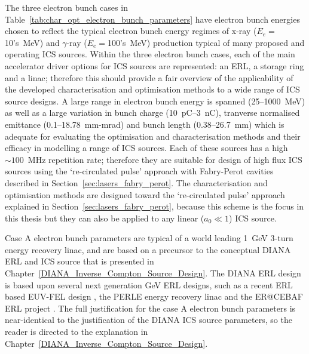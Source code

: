 \documentclass[../main.tex]{subfiles}
\begin{document}
The three electron bunch cases in Table~\ref{tab:char_opt_electron_bunch_parameters} have electron bunch energies chosen to reflect the typical electron bunch energy regimes of x-ray ($E_{e} =$10's~\si{\mega\electronvolt}) and $\gamma$-ray ($E_{e} =$100's~\si{\mega\electronvolt}) production typical of many proposed and operating ICS sources. Within the three electron bunch cases, each of the main accelerator driver options for ICS sources are represented: an ERL, a storage ring and a linac; therefore this should provide a fair overview of the applicability of the developed characterisation and optimisation methods to a wide range of ICS source designs. A large range in electron bunch energy is spanned (25--1000~\si{\mega\electronvolt}) as well as a large variation in bunch charge (10~\si{\pico\coulomb}--3~\si{\nano\coulomb}), tranverse normalised emittance (0.1--18.78~\si{\milli\meter}-\si{\milli\radian}) and bunch length (0.38--26.7~\si{\milli\meter}) which is adequate for evaluating the optimisation and characterisation methods and their efficacy in modelling a range of ICS sources. Each of these sources has a high $\sim100$~\si{\mega\hertz} repetition rate; therefore they are suitable for design of high flux ICS sources using the `re-circulated pulse' approach with Fabry-Perot cavities described in Section~\ref{sec:lasers_fabry_perot}. The characterisation and optimisation methods are designed toward the `re-circulated pulse' approach explained in Section~\ref{sec:lasers_fabry_perot}, because this scheme is the focus in this thesis but they can also be applied to any linear ($a_{0}\ll 1$) ICS source. 

Case A electron bunch parameters are typical of a world leading 1~\si{\giga\electronvolt} 3-turn energy recovery linac, and are based on a precursor to the conceptual DIANA ERL and ICS source that is presented in Chapter~\ref{DIANA_Inverse_Compton_Source_Design}. The DIANA ERL design is based upon several next generation \si{\giga\electronvolt} ERL designs, such as a recent ERL based EUV-FEL design \cite{akkermans2017compact}, the PERLE energy recovery linac \cite{angal2018perle} and the ER@CEBAF ERL project \cite{meot2016er,bogacz2016er}. The full justification for the case A electron bunch parameters is near-identical to the justification of the DIANA ICS source parameters, so the reader is directed to the explanation in Chapter~\ref{DIANA_Inverse_Compton_Source_Design}.      
\end{document}

